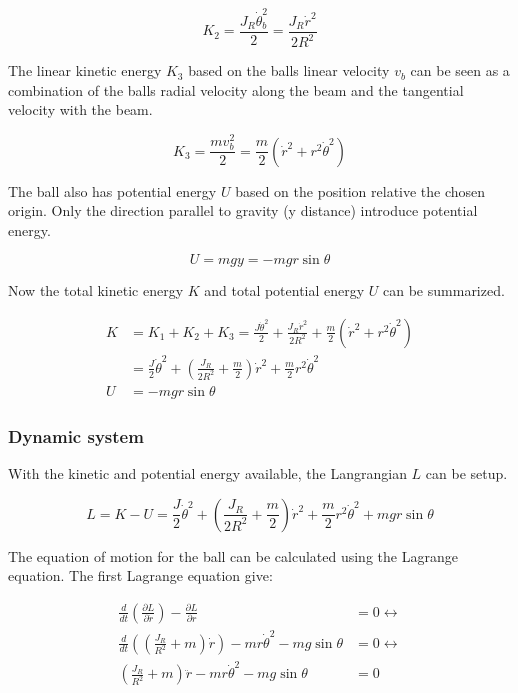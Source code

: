 \documentclass[a4paper, titlepage]{article}
\begin{document}
\begin{equation}
K_2 = \frac{J_R\dot{\theta}_b^2}{2} = \frac{J_R\dot{r}^2}{2R^2}
\end{equation}

The linear kinetic energy $K_3$ based on the balls linear velocity $v_b$ can be seen as a combination of the balls radial velocity along the beam and the tangential velocity with the beam.

\begin{equation}
K_3 = \frac{mv_b^2}{2} = \frac{m}{2}(\dot{r}^2 + r^2\dot{\theta}^2)
\end{equation}

The ball also has potential energy $U$ based on the position relative the chosen origin.
Only the direction parallel to gravity (y distance) introduce potential energy.

\begin{equation}
U = mgy = -mgr\sin{\theta}
\end{equation}

Now the total kinetic energy $K$ and total potential energy $U$ can be summarized.

\begin{equation}
\begin{split}
K &= K_1 + K_2 + K_3 = 
\frac{J\dot{\theta}^2}{2} + 
\frac{J_R\dot{r}^2}{2R^2} + 
\frac{m}{2}(\dot{r}^2 + r^2\dot{\theta}^2) \\
&= \frac{J}{2}\dot{\theta}^2 + 
(\frac{J_R}{2R^2} + \frac{m}{2})\dot{r}^2 + 
\frac{m}{2}r^2\dot{\theta}^2 \\
U &= -mgr\sin{\theta}
\end{split}
\end{equation}

\subsubsection{Dynamic system}
With the kinetic and potential energy available, the Langrangian $L$ can be setup.

\begin{equation}
L = K - U = 
\frac{J}{2}\dot{\theta}^2 + 
(\frac{J_R}{2R^2} + \frac{m}{2})\dot{r}^2 + 
\frac{m}{2}r^2\dot{\theta}^2 +
mgr\sin{\theta}
\end{equation}

The equation of motion for the ball can be calculated using the Lagrange equation.
The first Lagrange equation give:

\begin{equation}
\begin{split}
\frac{d}{dt}\left(\frac{\partial L}{\partial \dot{r}}\right) - \frac{\partial L}{\partial r} &= 0 \leftrightarrow \\
\frac{d}{dt}\left(\left(\frac{J_R}{R^2} + m\right)\dot{r}\right) - mr\dot{\theta}^2 - mg\sin{\theta} &= 0 \leftrightarrow \\
\left(\frac{J_R}{R^2} + m\right)\ddot{r} - mr\dot{\theta}^2 - mg\sin{\theta} &= 0
\label{equ:ballDiff}
\end{split}
\end{equation}
\end{document}
